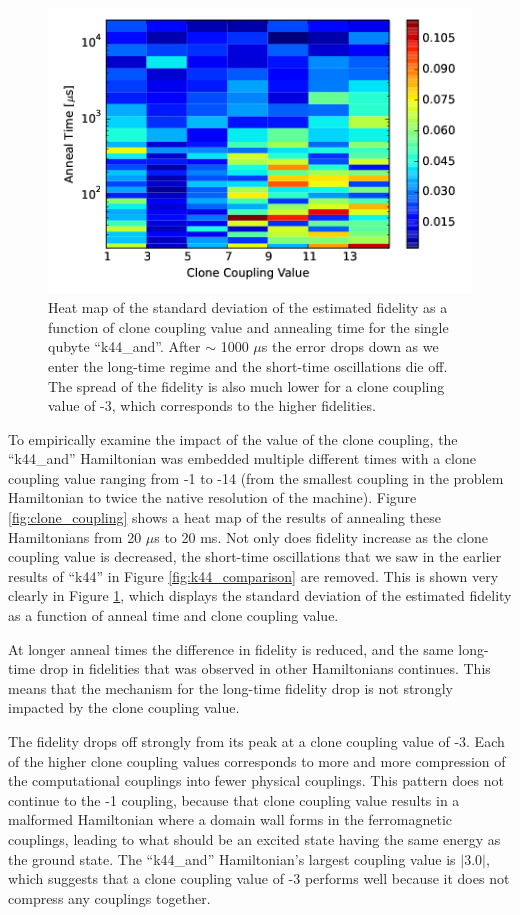 \begin{figure}
	\includegraphics{img/t_c.png}
	\caption[Fidelity Standard Deviation]{Heat map of the standard deviation of the estimated fidelity as a function of clone coupling value and annealing time for the single qubyte ``k44\_and''.  After $\sim$ 1000 $\mu$s the error drops down as we enter the long-time regime and the short-time oscillations die off.  The spread of the fidelity is also much lower for a clone coupling value of -3, which corresponds to the higher fidelities.}
	\label{fig:std_time}
\end{figure}

To empirically examine the impact of the value of the clone coupling, the ``k44\_and'' Hamiltonian was embedded multiple different times with a clone coupling value ranging from -1 to -14 (from the smallest coupling in the problem Hamiltonian to twice the native resolution of the machine).  Figure \ref{fig:clone_coupling} shows a heat map of the results of annealing these Hamiltonians from 20 $\mu$s to 20 ms.  Not only does fidelity increase as the clone coupling value is decreased, the short-time oscillations that we saw in the earlier results of ``k44'' in Figure \ref{fig:k44_comparison} are removed.  This is shown very clearly in Figure \ref{fig:std_time}, which displays the standard deviation of the estimated fidelity as a function of anneal time and clone coupling value.

At longer anneal times the difference in fidelity is reduced, and the same long-time drop in fidelities that was observed in other Hamiltonians continues.  This means that the mechanism for the long-time fidelity drop is not strongly impacted by the clone coupling value.

The fidelity drops off strongly from its peak at a clone coupling value of -3.  Each of the higher clone coupling values corresponds to more and more compression of the computational couplings into fewer physical couplings.  This pattern does not continue to the -1 coupling, because that clone coupling value results in a malformed Hamiltonian where a domain wall forms in the ferromagnetic couplings, leading to what should be an excited state having the same energy as the ground state.  The ``k44\_and'' Hamiltonian's largest coupling value is $|3.0|$, which suggests that a clone coupling value of -3 performs well because it does not compress any couplings together.

